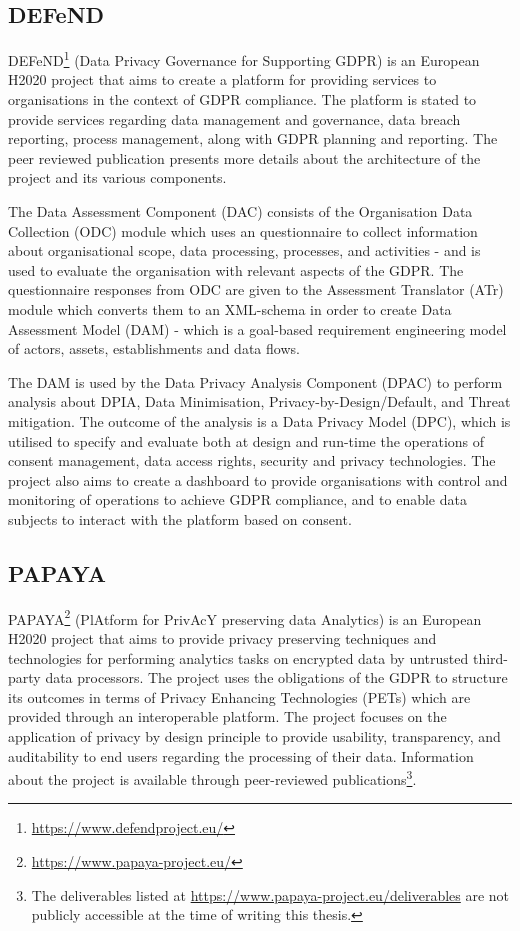 \subsection*{DEFeND}
DEFeND\footnote{\url{https://www.defendproject.eu/}} (Data Privacy Governance for Supporting GDPR) is an European H2020 project that aims to create a platform for providing services to organisations in the context of GDPR compliance. The platform is stated to provide services regarding data management and governance, data breach reporting, process management, along with GDPR planning and reporting. The peer reviewed publication \cite{piras_defend_2019} presents more details about the architecture of the project and its various components.

The Data Assessment Component (DAC) consists of the Organisation Data Collection (ODC) module which uses an questionnaire to collect information about organisational scope, data processing, processes, and activities - and is used to evaluate the organisation with relevant aspects of the GDPR. The questionnaire responses from ODC are given to the Assessment Translator (ATr) module which converts them to an XML-schema in order to create Data Assessment Model (DAM) - which is a goal-based requirement engineering model of actors, assets, establishments and data flows.

The DAM is used by the Data Privacy Analysis Component (DPAC) to perform analysis about DPIA, Data Minimisation, Privacy-by-Design/Default, and Threat mitigation. The outcome of the analysis is a Data Privacy Model (DPC), which is utilised to specify and evaluate both at design and run-time the operations of consent management, data access rights, security and privacy technologies. The project also aims to create a dashboard to provide organisations with control and monitoring of operations to achieve GDPR compliance, and to enable data subjects to interact with the platform based on consent.

\subsection*{PAPAYA}
PAPAYA\footnote{\url{https://www.papaya-project.eu/}} (PlAtform for PrivAcY preserving data Analytics) is an European H2020 project that aims to provide privacy preserving techniques and technologies for performing analytics tasks on encrypted data by untrusted third-party data processors. The project uses the obligations of the GDPR to structure its outcomes in terms of Privacy Enhancing Technologies (PETs) which are provided through an interoperable platform. The project focuses on the application of privacy by design principle to provide usability, transparency, and auditability to end users regarding the processing of their data. Information about the project is available through peer-reviewed publications\footnote{The deliverables listed at \url{https://www.papaya-project.eu/deliverables} are not publicly accessible at the time of writing this thesis.}.

